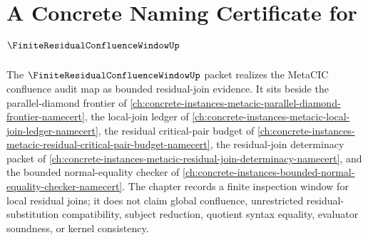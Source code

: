 \chapter{A Concrete Naming Certificate for $\FiniteResidualConfluenceWindowUp$}
\label{ch:concrete-instances-finite-residual-confluence-window-namecert}

The $\FiniteResidualConfluenceWindowUp$ packet realizes the MetaCIC confluence audit map as bounded residual-join evidence. It sits beside the parallel-diamond frontier of \autoref{ch:concrete-instances-metacic-parallel-diamond-frontier-namecert}, the local-join ledger of \autoref{ch:concrete-instances-metacic-local-join-ledger-namecert}, the residual critical-pair budget of \autoref{ch:concrete-instances-metacic-residual-critical-pair-budget-namecert}, the residual-join determinacy packet of \autoref{ch:concrete-instances-metacic-residual-join-determinacy-namecert}, and the bounded normal-equality checker of \autoref{ch:concrete-instances-bounded-normal-equality-checker-namecert}. The chapter records a finite inspection window for local residual joins; it does not claim global confluence, unrestricted residual-substitution compatibility, subject reduction, quotient syntax equality, evaluator soundness, or kernel consistency.

